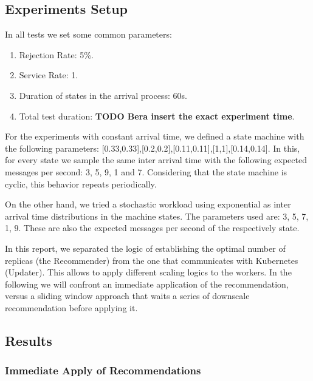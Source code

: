 \subsection{Experiments Setup}
In all tests we set some common parameters:
\begin{enumerate}
    \item Rejection Rate: 5\%.
    \item Service Rate: 1.
    \item Duration of states in the arrival process: 60s.
    \item Total test duration: \textbf{TODO Bera insert the exact experiment time}.
\end{enumerate}

For the experiments with constant arrival time, we defined a state machine with the following parameters: [0.33,0.33],[0.2,0.2],[0.11,0.11],[1,1],[0.14,0.14]. In this, for every state we sample the same inter arrival time with the following expected messages per second: 3, 5, 9, 1 and 7. Considering that the state machine is cyclic, this behavior repeats periodically.

On the other hand, we tried a stochastic workload using exponential as inter arrival time distributions in the machine states. The parameters used are: 3, 5, 7, 1, 9. These are also the expected messages per second of the respectively state.

In this report, we separated the logic of establishing the optimal number of replicas (the Recommender) from the one that communicates with Kubernetes (Updater). This allows to apply different scaling logics to the workers. In the following we will confront an immediate application of the recommendation, versus a sliding window approach that waits a series of downscale recommendation before applying it.

\subsection{Results}
\subsubsection{Immediate Apply of Recommendations}

